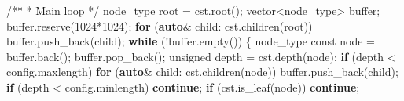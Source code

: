 \documentclass[
]{article}
\newenvironment{Shaded}{\begin{snugshade}}{\end{snugshade}}
\newcommand{\CommentTok}[1]{\textcolor[rgb]{0.48,0.49,0.49}{#1}}
\newcommand{\ControlFlowTok}[1]{\textcolor[rgb]{0.99,0.74,0.29}{\textbf{#1}}}
\newcommand{\DataTypeTok}[1]{\textcolor[rgb]{0.16,0.50,0.73}{#1}}
\newcommand{\DecValTok}[1]{\textcolor[rgb]{0.96,0.45,0.00}{#1}}
\newcommand{\KeywordTok}[1]{\textcolor[rgb]{0.81,0.81,0.76}{\textbf{#1}}}
\newcommand{\NormalTok}[1]{\textcolor[rgb]{0.81,0.81,0.76}{#1}}
\newcommand{\OperatorTok}[1]{\textcolor[rgb]{0.81,0.81,0.76}{#1}}
\begin{document}
\begin{Shaded}
\begin{Highlighting}[]
    \CommentTok{/**}
\CommentTok{     * Main loop}
\CommentTok{     */}
\NormalTok{    node\_type root }\OperatorTok{=}\NormalTok{ cst}\OperatorTok{.}\NormalTok{root}\OperatorTok{();}
\NormalTok{    vector}\OperatorTok{\textless{}}\NormalTok{node\_type}\OperatorTok{\textgreater{}}\NormalTok{ buffer}\OperatorTok{;}
\NormalTok{    buffer}\OperatorTok{.}\NormalTok{reserve}\OperatorTok{(}\DecValTok{1024}\OperatorTok{*}\DecValTok{1024}\OperatorTok{);}
    \ControlFlowTok{for} \OperatorTok{(}\KeywordTok{auto}\OperatorTok{\&}\NormalTok{ child}\OperatorTok{:}\NormalTok{ cst}\OperatorTok{.}\NormalTok{children}\OperatorTok{(}\NormalTok{root}\OperatorTok{))}
\NormalTok{        buffer}\OperatorTok{.}\NormalTok{push\_back}\OperatorTok{(}\NormalTok{child}\OperatorTok{);}
    \ControlFlowTok{while} \OperatorTok{(!}\NormalTok{buffer}\OperatorTok{.}\NormalTok{empty}\OperatorTok{())}
    \OperatorTok{\{}
\NormalTok{        node\_type }\DataTypeTok{const}\NormalTok{ node }\OperatorTok{=}\NormalTok{ buffer}\OperatorTok{.}\NormalTok{back}\OperatorTok{();}
\NormalTok{        buffer}\OperatorTok{.}\NormalTok{pop\_back}\OperatorTok{();}        
        \DataTypeTok{unsigned}\NormalTok{ depth }\OperatorTok{=}\NormalTok{ cst}\OperatorTok{.}\NormalTok{depth}\OperatorTok{(}\NormalTok{node}\OperatorTok{);}
        \ControlFlowTok{if} \OperatorTok{(}\NormalTok{depth }\OperatorTok{\textless{}}\NormalTok{ config}\OperatorTok{.}\NormalTok{maxlength}\OperatorTok{)}
            \ControlFlowTok{for} \OperatorTok{(}\KeywordTok{auto}\OperatorTok{\&}\NormalTok{ child}\OperatorTok{:}\NormalTok{ cst}\OperatorTok{.}\NormalTok{children}\OperatorTok{(}\NormalTok{node}\OperatorTok{))}
\NormalTok{                buffer}\OperatorTok{.}\NormalTok{push\_back}\OperatorTok{(}\NormalTok{child}\OperatorTok{);}
        \ControlFlowTok{if} \OperatorTok{(}\NormalTok{depth }\OperatorTok{\textless{}}\NormalTok{ config}\OperatorTok{.}\NormalTok{minlength}\OperatorTok{)}
            \ControlFlowTok{continue}\OperatorTok{;}
        \ControlFlowTok{if} \OperatorTok{(}\NormalTok{cst}\OperatorTok{.}\NormalTok{is\_leaf}\OperatorTok{(}\NormalTok{node}\OperatorTok{))}
            \ControlFlowTok{continue}\OperatorTok{;}
        

\end{Highlighting}
\end{Shaded}
\end{document}
